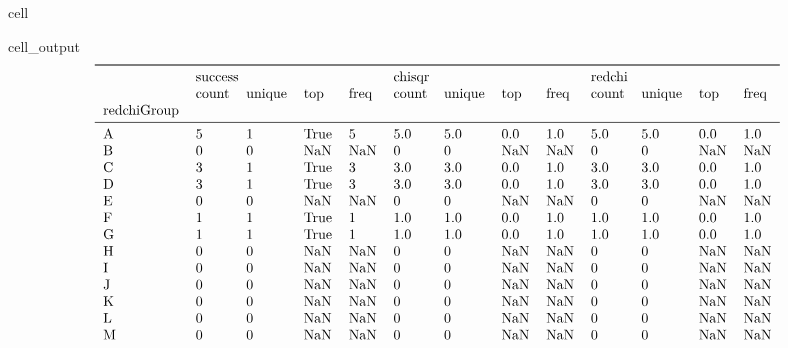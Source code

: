 \documentclass[letterpaper,table,10pt,english]{jupyterBook}
\begin{document}
\begin{sphinxuseclass}{cell}
\begin{sphinxVerbatimOutput}
\begin{sphinxuseclass}{cell_output}\begin{equation*}
\begin{split}\begin{tabular}{lllllllllllll}
\toprule
{} & \multicolumn{4}{l}{success} & \multicolumn{4}{l}{chisqr} & \multicolumn{4}{l}{redchi} \\
{} &   count & unique &   top & freq &  count & unique &  top & freq &  count & unique &  top & freq \\
redchiGroup &         &        &       &      &        &        &      &      &        &        &      &      \\
\midrule
A           &       5 &      1 &  True &    5 &    5.0 &    5.0 &  0.0 &  1.0 &    5.0 &    5.0 &  0.0 &  1.0 \\
B           &       0 &      0 &   NaN &  NaN &      0 &      0 &  NaN &  NaN &      0 &      0 &  NaN &  NaN \\
C           &       3 &      1 &  True &    3 &    3.0 &    3.0 &  0.0 &  1.0 &    3.0 &    3.0 &  0.0 &  1.0 \\
D           &       3 &      1 &  True &    3 &    3.0 &    3.0 &  0.0 &  1.0 &    3.0 &    3.0 &  0.0 &  1.0 \\
E           &       0 &      0 &   NaN &  NaN &      0 &      0 &  NaN &  NaN &      0 &      0 &  NaN &  NaN \\
F           &       1 &      1 &  True &    1 &    1.0 &    1.0 &  0.0 &  1.0 &    1.0 &    1.0 &  0.0 &  1.0 \\
G           &       1 &      1 &  True &    1 &    1.0 &    1.0 &  0.0 &  1.0 &    1.0 &    1.0 &  0.0 &  1.0 \\
H           &       0 &      0 &   NaN &  NaN &      0 &      0 &  NaN &  NaN &      0 &      0 &  NaN &  NaN \\
I           &       0 &      0 &   NaN &  NaN &      0 &      0 &  NaN &  NaN &      0 &      0 &  NaN &  NaN \\
J           &       0 &      0 &   NaN &  NaN &      0 &      0 &  NaN &  NaN &      0 &      0 &  NaN &  NaN \\
K           &       0 &      0 &   NaN &  NaN &      0 &      0 &  NaN &  NaN &      0 &      0 &  NaN &  NaN \\
L           &       0 &      0 &   NaN &  NaN &      0 &      0 &  NaN &  NaN &      0 &      0 &  NaN &  NaN \\
M           &       0 &      0 &   NaN &  NaN &      0 &      0 &  NaN &  NaN &      0 &      0 &  NaN &  NaN \\

\end{tabular}
\end{split}
\end{equation*}
\end{sphinxuseclass}
\end{sphinxVerbatimOutput}
\end{sphinxuseclass}
\end{document}
